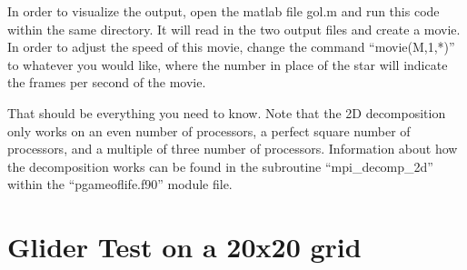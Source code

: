 \documentclass{article}
\begin{document}
\begin{enumerate}[label=\alph*)]
In order to visualize the output, open the matlab file gol.m and run this code
within the same directory. It will read in the two output files and create a
movie. In order to adjust the speed of this movie, change the command
``movie(M,1,*)'' to whatever you would like, where the number in place of the
star will indicate the frames per second of the movie. 

That should be everything you need to know. Note that the 2D decomposition only
works on an even number of processors, a perfect square number of processors,
and a multiple of three number of processors. Information about how the
decomposition works can be found in the subroutine ``mpi\_decomp\_2d'' within the
``pgameoflife.f90'' module file. 

\end{enumerate}

\section*{Glider Test on a 20x20 grid}
\end{document}
